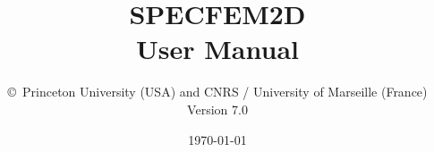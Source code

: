 \documentclass[oneside,english]{book}
\begin{document}
\thispagestyle{empty}
\vspace*{\fill}
\begingroup
\centering
{}
\endgroup
\vspace*{\fill}
\restoregeometry

\title{\textbf{SPECFEM2D}\\
\textbf{User Manual}}

\author{\copyright\ Princeton University (USA) and CNRS / University of Marseille (France)\\
Version 7.0
}

\date{\today}

\maketitle
\end{document}
